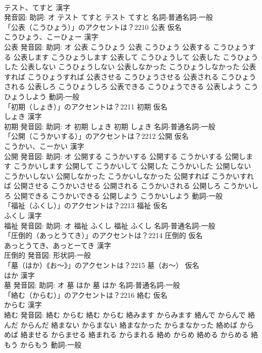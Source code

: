 \documentclass[8pt]{extreport}
\begin{document}
\begin{CJK}{UTF8}{min}
\\	テスト、てすと 漢字　
\\	発音図: 助詞: オ	テスト てすと		テスト てすと				名詞-普通名詞-一般 
\\	「公表（こうひょう）」のアクセントは？2210	公表 仮名　
\\	こうひょう、こーひょー 漢字　
\\	公表 発音図: 助詞: オ	公表 こうひょう		公表 こうひょう 公表する こうひょうする 公表します こうひょうします 公表して こうひょうして 公表した こうひょうした 公表しない こうひょうしない 公表しなかった こうひょうしなかった 公表すれば こうひょうすれば 公表させる こうひょうさせる 公表される こうひょうされる 公表しろ こうひょうしろ 公表できる こうひょうできる 公表しよう こうひょうしよう				動詞-一般 
\\	「初期（しょき）」のアクセントは？2211	初期 仮名　
\\	しょき 漢字　
\\	初期 発音図: 助詞: オ	初期 しょき		初期 しょき				名詞-普通名詞-一般 
\\	「公開（こうかいする）」のアクセントは？2212	公開 仮名　
\\	こうかい、こーかい 漢字　
\\	公開 発音図: 助詞: オ	公開する こうかいする		公開する こうかいする 公開します こうかいします 公開して こうかいして 公開した こうかいした 公開しない こうかいしない 公開しなかった こうかいしなかった 公開すれば こうかいすれば 公開させる こうかいさせる 公開される こうかいされる 公開しろ こうかいしろ 公開できる こうかいできる 公開しよう こうかいしよう				動詞-一般 
\\	「福祉（ふくし）」のアクセントは？2213	福祉 仮名　
\\	ふくし 漢字　
\\	福祉 発音図: 助詞: オ	福祉 ふくし		福祉 ふくし				名詞-普通名詞-一般 
\\	「圧倒的（あっとうてき）」のアクセントは？2214	圧倒的 仮名　
\\	あっとうてき、あっとーてき 漢字　
\\	圧倒的 発音図:							形状詞-一般 
\\	「墓（はか）《お〜》」のアクセントは？2215	墓（お〜） 仮名　
\\	はか 漢字　
\\	墓 発音図: 助詞: オ	墓 はか		墓 はか				名詞-普通名詞-一般 
\\	「絡む（からむ）」のアクセントは？2216	絡む 仮名　
\\	からむ 漢字　
\\	絡む 発音図:	絡む からむ		絡む からむ 絡みます からみます 絡んで からんで 絡んだ からんだ 絡まない からまない 絡まなかった からまなかった 絡めば からめば 絡ませる からませる 絡まれる からまれる 絡め からめ 絡める からめる 絡もう からもう				動詞-一般 

\end{CJK}
\end{document}
